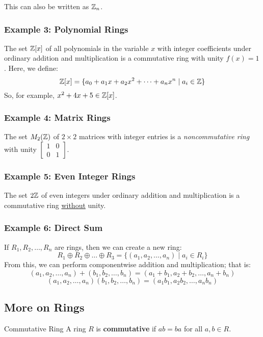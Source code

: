 \documentclass[letterpaper]{article}
\begin{document}
\bigskip 

This can also be written as $\mathbb{Z}_n$. 

\subsubsection{Example 3: Polynomial Rings}
The set $\mathbb{Z}[x]$ of all polynomials in the variable $x$ with integer coefficients under ordinary addition and multiplication is a commutative ring with unity $f(x) = 1$. Here, we define: 
\[\mathbb{Z}[x] = \{a_0 + a_1 x + a_2 x^2 + \dots + a_n x^n \mid a_i \in \mathbb{Z}\}\]
So, for example, $x^2 + 4x + 5 \in \mathbb{Z}[x]$. 

\subsubsection{Example 4: Matrix Rings}
The set $M_{2}(\mathbb{Z})$ of $2 \times 2$ matrices with integer entries is a \emph{noncommutative ring} with unity $\begin{bmatrix} 1 & 0 \\ 0 & 1 \end{bmatrix}$.

\subsubsection{Example 5: Even Integer Rings}
The set $2\mathbb{Z}$ of even integers under ordinary addition and multiplication is a commutative ring \underline{without} unity. 

\subsubsection{Example 6: Direct Sum}
If $R_1, R_2, \dots, R_n$ are rings, then we can create a new ring: 
\[R_1 \oplus R_2 \oplus \dots \oplus R_3 = \{(a_1, a_2, \dots, a_n) \mid a_i \in R_i\}\]
From this, we can perform componentwise addition and multiplication; that is: 
\[(a_1, a_2, \dots, a_n) + (b_1, b_2, \dots, b_n) = (a_1 + b_1, a_2 + b_2, \dots, a_n + b_n)\]
\[(a_1, a_2, \dots, a_n)(b_1, b_2, \dots, b_n) = (a_1 b_1, a_2 b_2, \dots, a_n b_n)\]

\subsection{More on Rings}
\begin{definition}{Commutative Ring}{}
    A ring $R$ is \textbf{commutative} if $ab = ba$ for all $a, b \in R$.
\end{definition}
\end{document}
